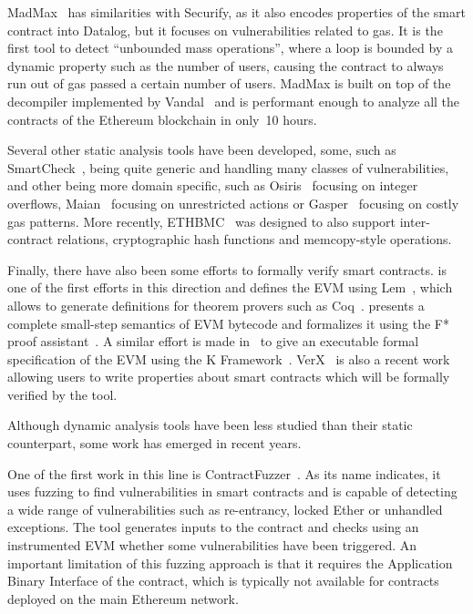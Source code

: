 MadMax~\cite{Grech2018} has similarities with Securify, as it also encodes properties of the smart contract into Datalog, but it focuses on vulnerabilities related to gas.
It is the first tool to detect ``unbounded mass operations'', where a loop is bounded by a dynamic property such as the number of users, causing the contract to always run out of gas passed a certain number of users.
MadMax is built on top of the decompiler implemented by Vandal~\cite{Brent2018} and is performant enough to analyze all the contracts of the Ethereum blockchain in only~10 hours.

Several other static analysis tools have been developed, some, such as SmartCheck~\cite{Tikhomirov2017}, being quite generic and handling many classes of vulnerabilities, and other being more domain specific, such as Osiris~\cite{torres2018osiris} focusing on integer overflows, Maian~\cite{Nikolic2018a} focusing on unrestricted actions or Gasper~\cite{Chen2017} focusing on costly gas patterns.
More recently, ETHBMC~\cite{251546} was designed to also support inter-contract relations, cryptographic hash functions and memcopy-style operations.

Finally, there have also been some efforts to formally verify smart contracts. \cite{Hirai2017} is one of the first efforts in this direction and defines the EVM using Lem~\cite{mulligan2014lem}, which allows to generate definitions for theorem provers such as Coq~\cite{barras1997coq}. \cite{Grishchenko2018} presents a complete small-step semantics of EVM bytecode and formalizes it using the F* proof assistant~\cite{SwamyCFSBY11}. A similar effort is made in~\cite{Hildenbrandt2018} to give an executable formal specification of the EVM using the K Framework~\cite{rosu-serbanuta-2010-jlap}. VerX~\cite{permenev2019verx} is also a recent work allowing users to write properties about smart contracts which will be formally verified by the tool.

 Although dynamic analysis tools have been less studied than their static counterpart, some work has emerged in recent years.

One of the first work in this line is ContractFuzzer~\cite{Jiang2018}.
As its name indicates, it uses fuzzing to find vulnerabilities in smart contracts and is capable of detecting a wide range of vulnerabilities such as re-entrancy, locked Ether or unhandled exceptions.
The tool generates inputs to the contract and checks using an instrumented EVM whether some vulnerabilities have been triggered.
An important limitation of this fuzzing approach is that it requires the Application Binary Interface of the contract, which is typically not available for contracts deployed on the main Ethereum network.

